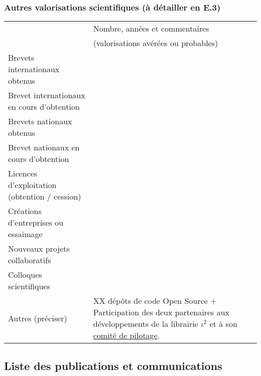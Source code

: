 \subsubsection*{Autres valorisations scientifiques (à détailler en E.3)} 

\begin{table}[htbp]
\small
    \centering
    \begin{tabular}{|p{5.5cm}|p{6cm}|}
    \hline
& Nombre, années et commentaires \\
&(valorisations avérées ou probables)\\\hline
Brevets internationaux obtenus& \\\hline
Brevet internationaux en cours d’obtention& \\\hline
Brevets nationaux obtenus& \\\hline
Brevet nationaux en cours d’obtention& \\\hline
Licences d’exploitation (obtention / cession)& \\\hline
Créations d’entreprises ou essaimage& \\\hline
Nouveaux projets collaboratifs & \\\hline
Colloques scientifiques& \\\hline
Autres (préciser)& XX dépôts de code Open Source + Participation des deux partenaires aux développements de la librairie $\iota^2$ et à son \href{https://framagit.org/iota2-project/iota2/-/wikis/Project-Steering-Committee}{comité de pilotage}. \\
\hline
    \end{tabular}
    \label{tab:valo_other}
\end{table}


\subsection{Liste des publications et communications}

\nocite{*}



